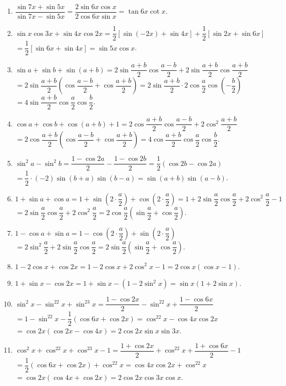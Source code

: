 \begin{bt}
{\begin{enumerate}
			\item $\dfrac{\sin 7x+\sin 5x}{\sin 7x-\sin 5x}=\dfrac{2\sin 6x\cos x}{2\cos 6x\sin x}=\tan 6x\cot x$.
			\item $\sin x\cos 3x+\sin 4x\cos 2x=\dfrac{1}{2}\left[\sin (-2x)+\sin 4x\right]+\dfrac{1}{2}\left[\sin 2x+\sin 6x\right]$ \\
			$=\dfrac{1}{2}\left[\sin 6x+\sin 4x\right]=\sin 5x\cos x$.
			\item $\sin a+\sin b+\sin (a+b)=2\sin \dfrac{a+b}{2} \cos \dfrac{a-b}{2}+2\sin \dfrac{a+b}{2} \cos \dfrac{a+b}{2}$ \\
			$=2\sin \dfrac{a+b}{2} \left(\cos \dfrac{a-b}{2}+\cos \dfrac{a+b}{2}\right)=2\sin \dfrac{a+b}{2}\cdot 2\cos \dfrac{a}{2} \cos \left(-\dfrac{b}{2}\right)$ \\
			$=4\sin \dfrac{a+b}{2} \cos \dfrac{a}{2} \cos \dfrac{b}{2}$.
			\item $\cos a+\cos b+\cos (a+b)+1=2\cos \dfrac{a+b}{2}\cos \dfrac{a-b}{2}+2\cos^2\dfrac{a+b}{2}$ \\
			$=2\cos \dfrac{a+b}{2} \left(\cos \dfrac{a-b}{2}+\cos \dfrac{a+b}{2}\right)=4\cos \dfrac{a+b}{2}\cos \dfrac{a}{2}\cos \dfrac{b}{2}$.
			\item $\sin^2a-\sin^2b=\dfrac{1-\cos 2a}{2}-\dfrac{1-\cos 2b}{2}=\dfrac{1}{2}\left(\cos 2b-\cos 2a\right)$ \\
			$=\dfrac{1}{2}\cdot (-2)\sin (b+a)\sin (b-a)=\sin (a+b)\sin (a-b)$.
			\item $1+\sin a+\cos a=1+\sin \left(2\cdot \dfrac{a}{2}\right)+\cos \left(2\cdot \dfrac{a}{2}\right)=1+2\sin \dfrac{a}{2}\cos \dfrac{a}{2}+2\cos^2\dfrac{a}{2}-1$ \\
			$=2\sin \dfrac{a}{2}\cos \dfrac{a}{2}+2\cos^2\dfrac{a}{2}=2\cos \dfrac{a}{2} \left(\sin \dfrac{a}{2}+\cos \dfrac{a}{2}\right)$.
			\item $1-\cos a+\sin a=1-\cos \left(2\cdot \dfrac{a}{2}\right)+\sin \left(2\cdot \dfrac{a}{2}\right)$ \\
			$=2\sin^2\dfrac{a}{2}+2\sin \dfrac{a}{2}\cos \dfrac{a}{2}=2\sin \dfrac{a}{2}\left(\sin \dfrac{a}{2}+\cos \dfrac{a}{2}\right)$.
			\item $1-2\cos x+\cos 2x=1-2\cos x+2\cos^2x-1=2\cos x\left(\cos x-1\right)$.
			\item $1+\sin x-\cos 2x=1+\sin x-\left(1-2\sin^2x\right)=\sin x\left(1+2\sin x\right)$.
			\item $\sin^2x-\sin^22x+\sin^23x=\dfrac{1-\cos 2x}{2}-\sin^22x+\dfrac{1-\cos 6x}{2}$ \\
			$=1-\sin^22x-\dfrac{1}{2}\left(\cos 6x+\cos 2x\right)=\cos^22x-\cos 4x\cos 2x$ \\
			$=\cos 2x\left(\cos 2x-\cos 4x\right)=2\cos 2x\sin x\sin 3x$.
			\item $\cos^2x+\cos^22x+\cos^23x-1=\dfrac{1+\cos 2x}{2}+\cos^22x+\dfrac{1+\cos 6x}{2}-1$ \\
			$=\dfrac{1}{2}\left(\cos 6x+\cos 2x\right)+\cos^22x=\cos 4x\cos 2x+\cos^22x$ \\
			$=\cos 2x\left(\cos 4x+\cos 2x\right)=2\cos 2x\cos 3x\cos x$.
		\end{enumerate}
	}
\end{bt}
